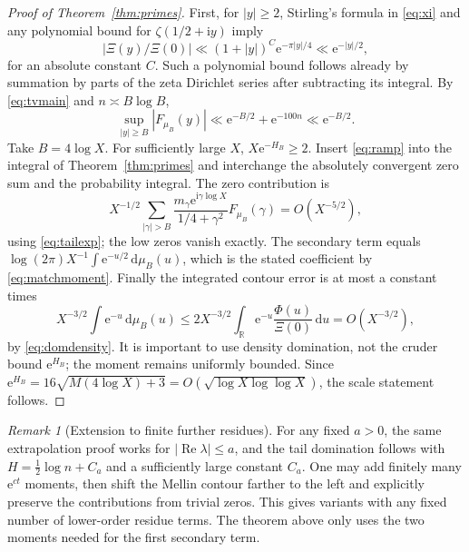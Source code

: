 \documentclass[11pt]{article}
\theoremstyle{remark}\newtheorem{remark}[theorem]{Remark}
\newcommand{\R}{\mathbb R}\newcommand{\C}{\mathbb C}\newcommand{\e}{\mathrm e}\newcommand{\ii}{\mathrm i}\newcommand{\dd}{\,\mathrm d}\newcommand{\abs}[1]{\left|#1\right|}\newcommand{\norm}[1]{\left\|#1\right\|}\newcommand{\ord}{\operatorname{ord}}\newcommand{\re}{\operatorname{Re}}\newcommand{\im}{\operatorname{Im}}\newcommand{\supp}{\operatorname{supp}}
\begin{document}
\begin{proof}[Proof of Theorem~\ref{thm:primes}]
First, for $|y|\ge2$, Stirling's formula in \eqref{eq:xi} and any polynomial bound for $\zeta(1/2+\ii y)$ imply
\[
|\Xi(y)/\Xi(0)|\ll (1+|y|)^C\e^{-\pi|y|/4}\ll \e^{-|y|/2},
\]
for an absolute constant $C$. Such a polynomial bound follows already by summation by parts of the zeta Dirichlet series after subtracting its integral. By \eqref{eq:tvmain} and $n\asymp B\log B$,
\begin{equation}\label{eq:tailexp}
\sup_{|y|\ge B}|F_{\mu_B}(y)|\ll \e^{-B/2}+\e^{-100n}\ll\e^{-B/2}.
\end{equation}
Take $B=4\log X$. For sufficiently large $X$, $X\e^{-H_B}\ge2$. Insert \eqref{eq:ramp} into the integral of Theorem~\ref{thm:primes} and interchange the absolutely convergent zero sum and the probability integral. The zero contribution is
\[
X^{-1/2}\sum_{|\gamma|>B}\frac{m_\gamma\e^{\ii\gamma\log X}}{1/4+\gamma^2}F_{\mu_B}(\gamma)=O(X^{-5/2}),
\]
using \eqref{eq:tailexp}; the low zeros vanish exactly. The secondary term equals $\log(2\pi)X^{-1}\int\e^{-u/2}\dd\mu_B(u)$, which is the stated coefficient by \eqref{eq:matchmoment}. Finally the integrated contour error is at most a constant times
\[
X^{-3/2}\int\e^{-u}\dd\mu_B(u)\le 2X^{-3/2}\int_\R \e^{-u}\frac{\Phi(u)}{\Xi(0)}\dd u=O(X^{-3/2}),
\]
by \eqref{eq:domdensity}. It is important to use density domination, not the cruder bound $\e^{H_B}$; the moment remains uniformly bounded. Since $\e^{H_B}=16\sqrt{M(4\log X)+3}=O(\sqrt{\log X\log\log X})$, the scale statement follows.
\end{proof}

\begin{remark}[Extension to finite further residues]
For any fixed $a>0$, the same extrapolation proof works for $|\re\lambda|\le a$, and the tail domination follows with $H=\frac12\log n+C_a$ and a sufficiently large constant $C_a$. One may add finitely many $\e^{ct}$ moments, then shift the Mellin contour farther to the left and explicitly preserve the contributions from trivial zeros. This gives variants with any fixed number of lower-order residue terms. The theorem above only uses the two moments needed for the first secondary term.
\end{remark}
\end{document}
